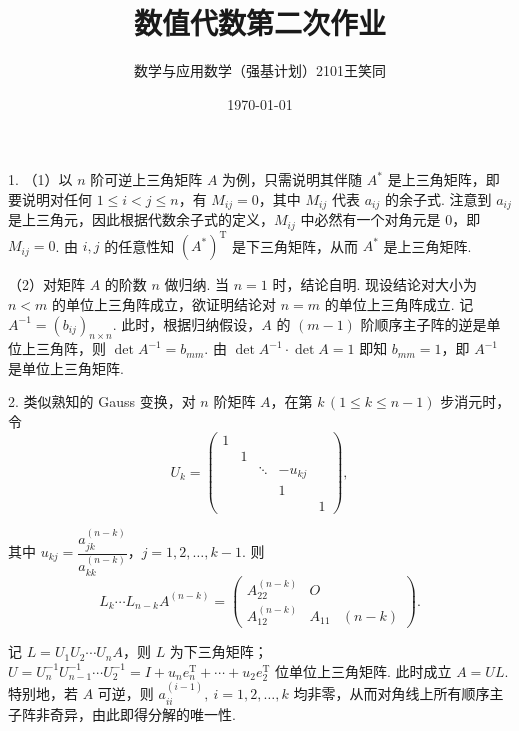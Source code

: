 \documentclass[UTF8]{ctexart}
\title{\vspace{-2cm}数值代数第二次作业}
\author{数学与应用数学（强基计划）2101\quad 王笑同\quad 3210105450}
\date{\today}
\begin{document}
\maketitle

\pagestyle{plain}

1. （1）以 $n$ 阶可逆上三角矩阵 $A$ 为例，只需说明其伴随 $A^*$ 是上三角矩阵，即要说明对任何 $1\leqslant i<j\leqslant n$，有 $M_{ij}=0$，其中 $M_{ij}$ 代表 $a_{ij}$ 的余子式. 注意到 $a_{ij}$ 是上三角元，因此根据代数余子式的定义，$M_{ij}$ 中必然有一个对角元是 $0$，即 $M_{ij}=0$. 由 $i,j$ 的任意性知 $(A^{*})^{\mathrm{T}}$ 是下三角矩阵，从而 $A^*$ 是上三角矩阵.

（2）对矩阵 $A$ 的阶数 $n$ 做归纳. 当 $n=1$ 时，结论自明. 现设结论对大小为 $n<m$ 的单位上三角阵成立，欲证明结论对 $n=m$ 的单位上三角阵成立. 记 $A^{-1}=(b_{ij})_{n\times n}$. 此时，根据归纳假设，$A$ 的 $(m-1)$ 阶顺序主子阵的逆是单位上三角阵，则 $\det A^{-1}=b_{mm}$. 由 $\det A^{-1}\cdot \det A=1$ 即知 $b_{mm}=1$，即 $A^{-1}$ 是单位上三角矩阵.

\quad

2. 类似熟知的 Gauss 变换，对 $n$ 阶矩阵 $A$，在第 $k\,(1\leqslant k\leqslant n-1)$ 步消元时，令
\[U_k=\begin{pmatrix}
    1\\
    &1\\
    &&\ddots&-u_{kj}&\\
    &&&1\\
    &&&&1
\end{pmatrix},\]

其中 $u_{kj}=\dfrac{a_{jk}^{(n-k)}}{a_{kk}^{(n-k)}}$，$j=1,2,\dots,k-1$. 则
\[L_k\cdots L_{n-k}A^{(n-k)}=\begin{pmatrix}
    A_{22}^{(n-k)}&O\\
    A_{12}^{(n-k)}&A_{11}&{(n-k)}
\end{pmatrix}.\]

记 $L=U_1U_2\cdots U_nA$，则 $L$ 为下三角矩阵；$U=U_n^{-1}U_{n-1}^{-1}\cdots U_2^{-1}=I+u_ne_n^{\mathrm{T}}+\cdots+u_2e_2^{\mathrm{T}}$ 位单位上三角矩阵. 此时成立 $A=UL$. 特别地，若 $A$ 可逆，则 $a_{ii}^{(i-1)},\ i=1,2,\dots,k$ 均非零，从而对角线上所有顺序主子阵非奇异，由此即得分解的唯一性.

\quad
\end{document}
